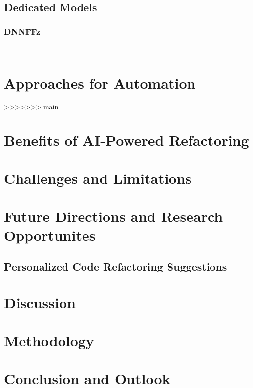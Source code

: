 \documentclass[conference]{IEEEtran}
\begin{document}
\subsection{Dedicated Models}
\subsubsection{DNNFFz}

=======
\section{Approaches for Automation}\label{automation}

>>>>>>> main
\section{Benefits of AI-Powered Refactoring}\label{benefits}


\section{Challenges and Limitations}


\section{Future Directions and Research Opportunites}


\subsection{Personalized Code Refactoring Suggestions}
\section{Discussion}


\section{Methodology}

\section{Conclusion and Outlook}

\end{document}
